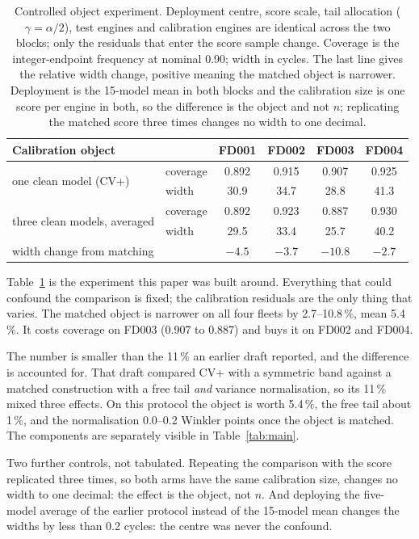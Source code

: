 \documentclass[journal]{IEEEtran}
\begin{document}
\begin{table}[t]
\centering
\caption{Controlled object experiment. Deployment centre, score scale, tail allocation
($\gamma=\alpha/2$), test engines and calibration engines are identical across the two blocks;
only the residuals that enter the score sample change. Coverage is the integer-endpoint
frequency at nominal 0.90; width in cycles. The last line gives the relative width change,
positive meaning the matched object is narrower. Deployment is the 15-model mean in both
blocks and the calibration size is one score per engine in both, so the difference is the
object and not $n$; replicating the matched score three times changes no width to one
decimal.}
\label{tab:object}
\small
\setlength{\tabcolsep}{5pt}
\begin{tabular}{llcccc}
\toprule
Calibration object & & FD001 & FD002 & FD003 & FD004\\
\midrule
\multirow{2}{*}{one clean model (CV+)}
 & coverage & 0.892 & 0.915 & 0.907 & 0.925\\
 & width    & 30.9 & 34.7 & 28.8 & 41.3\\
\midrule
\multirow{2}{*}{three clean models, averaged}
 & coverage & 0.892 & 0.923 & 0.887 & 0.930\\
 & width    & 29.5 & 33.4 & 25.7 & 40.2\\
\midrule
\multicolumn{2}{l}{width change from matching} & $-4.5$ & $-3.7$ & $-10.8$ & $-2.7$\\
\bottomrule
\end{tabular}
\end{table}

Table~\ref{tab:object} is the experiment this paper was built around. Everything that could
confound the comparison is fixed; the calibration residuals are the only thing that varies. The
matched object is narrower on all four fleets by 2.7--10.8\,\%, mean 5.4\,\%. It costs coverage
on FD003 (0.907 to 0.887) and buys it on FD002 and FD004.

The number is smaller than the 11\,\% an earlier draft reported, and the difference is
accounted for. That draft compared CV+ with a symmetric band against a matched construction
with a free tail \emph{and} variance normalisation, so its 11\,\% mixed three effects. On this
protocol the object is worth 5.4\,\%, the free tail about 1\,\%, and the normalisation 0.0--0.2
Winkler points once the object is matched. The components are separately visible in
Table~\ref{tab:main}.

Two further controls, not tabulated. Repeating the comparison with the score replicated three
times, so both arms have the same calibration size, changes no width to one decimal: the effect
is the object, not $n$. And deploying the five-model average of the earlier protocol instead of
the 15-model mean changes the widths by less than 0.2 cycles: the centre was never the
confound.
\end{document}
